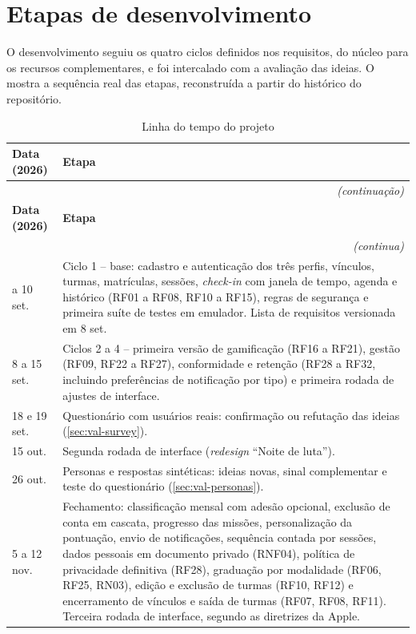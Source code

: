 \section{Etapas de desenvolvimento}

O desenvolvimento seguiu os quatro ciclos definidos nos requisitos, do
núcleo para os recursos complementares, e foi intercalado com a avaliação
das ideias. O  mostra a sequência real das
etapas, reconstruída a partir do histórico do repositório.

\begin{quadrolongo}
\begin{longtable}{|p{3.0cm}|p{10.3cm}|}
  \caption{Linha do tempo do projeto}\label{qua:linha-tempo}\\
  \hline
  \textbf{Data (2026)} & \textbf{Etapa} \\ \hline
\endfirsthead
  \multicolumn{2}{r}{\textit{(continuação)}}\\
  \hline
  \textbf{Data (2026)} & \textbf{Etapa} \\ \hline
\endhead
  \multicolumn{2}{r}{\textit{(continua)}}\\
\endfoot
\endlastfoot
    1 a 10 set. & Ciclo 1 -- base: cadastro e autenticação dos três perfis, vínculos, turmas, matrículas, sessões, \textit{check-in} com janela de tempo, agenda e histórico (RF01 a RF08, RF10 a RF15), regras de segurança e primeira suíte de testes em emulador. Lista de requisitos versionada em 8 set. \\ \hline
    8 a 15 set. & Ciclos 2 a 4 -- primeira versão de gamificação (RF16 a RF21), gestão (RF09, RF22 a RF27), conformidade e retenção (RF28 a RF32, incluindo preferências de notificação por tipo) e primeira rodada de ajustes de interface. \\ \hline
    18 e 19 set. & Questionário com usuários reais: confirmação ou refutação das ideias (\autoref{sec:val-survey}). \\ \hline
    15 out. & Segunda rodada de interface (\textit{redesign} ``Noite de luta''). \\ \hline
    26 out. & Personas e respostas sintéticas: ideias novas, sinal complementar e teste do questionário (\autoref{sec:val-personas}). \\ \hline
    5 a 12 nov. & Fechamento: classificação mensal com adesão opcional, exclusão de conta em cascata, progresso das missões, personalização da pontuação, envio de notificações, sequência contada por sessões, dados pessoais em documento privado (RNF04), política de privacidade definitiva (RF28), graduação por modalidade (RF06, RF25, RN03), edição e exclusão de turmas (RF10, RF12) e encerramento de vínculos e saída de turmas (RF07, RF08, RF11). Terceira rodada de interface, segundo as diretrizes da Apple. \\ \hline

\end{longtable}
\end{quadrolongo}
